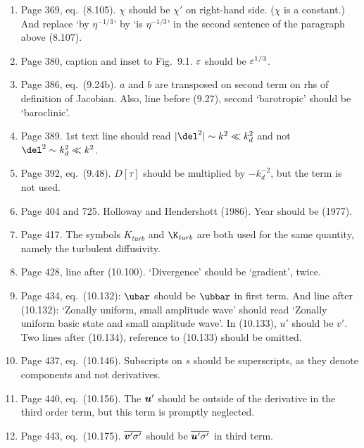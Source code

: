 \documentclass[10pt]{article}
\newcommand{\eq}{eq.\ } \newcommand{\Eq}{Eq.\ }
\begin{document}
\begin{enumerate}
\item Page 369, \eq (8.105). $\chi$ should be $\chi'$ on right-hand side. ($\chi$ is a constant.) And replace `by $\eta^{-1/3}$' by `is $\eta^{-1/3}$' in
the second sentence of the paragraph above (8.107). 

\item Page 380, caption and inset to Fig.\ 9.1. $\varepsilon$ should be $\varepsilon^{1/3}$. 

\item Page 386, \eq (9.24b). $a$ and $b$ are transposed on second term on rhs of definition of Jacobian. Also, line before (9.27), second `barotropic' should be `baroclinic'.

\item Page 389. 1st text line should read $|\del^2| \sim
k^2 \ll \kd^2$ and not $\del^2 \sim
\kd^2 \ll k^2$.

\item Page 392, \eq (9.48). $D[\tau]$ should be multiplied by $-k_d^{-2}$, but the term is not used.

\item Page 404 and 725. Holloway and Hendershott (1986). Year should be (1977).

\item Page 417. The symbols $K_{\textit{turb}}$ and $\K_{\textit{turb}}$ are both used for the same quantity, namely the turbulent diffusivity.

\item Page 428, line after (10.100). `Divergence' should be `gradient', twice.

\item Page 434, \eq (10.132): $\ubar$ should be $\ubbar$ in first term. And line after (10.132): `Zonally uniform, small amplitude wave' should read `Zonally uniform basic state and small amplitude wave'. In (10.133), $u'$ should be $v'$. Two lines after (10.134), reference to (10.133) should be omitted.

\item Page 437, \eq (10.146). Subscripts on $s$ should be superscripts, as they denote components and not derivatives. 

\item Page 440, \eq (10.156). The ${\bm {u}}'$ should be outside of the derivative in the third order term, but this term is promptly neglected. 

\item Page 443, \eq (10.175). $\overline{{\bm {v}}' \sigma'}^{}$ should be $\overline{{\bm {u}}' \sigma'}^{}$ in third term.
 

\end{enumerate}
\end{document}
